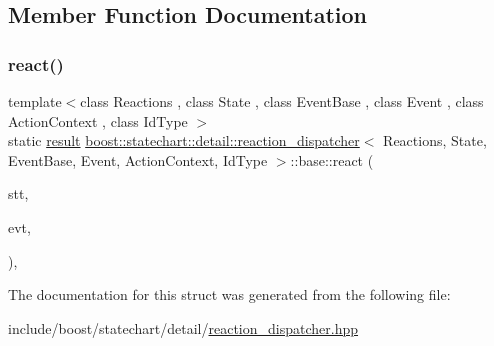\subsection{Member Function Documentation}
\mbox{\label{structboost_1_1statechart_1_1detail_1_1reaction__dispatcher_1_1base_acc2a12ce404e84665adf2b53ad6be6c0}} 
\subsubsection{\texorpdfstring{react()}{react()}}
{\footnotesize\ttfamily template$<$class Reactions , class State , class Event\+Base , class Event , class Action\+Context , class Id\+Type $>$ \\
static \mbox{\hyperlink{namespaceboost_1_1statechart_abe807f6598b614d6d87bb951ecd92331}{result}} \mbox{\hyperlink{classboost_1_1statechart_1_1detail_1_1reaction__dispatcher}{boost\+::statechart\+::detail\+::reaction\+\_\+dispatcher}}$<$ Reactions, State, Event\+Base, Event, Action\+Context, Id\+Type $>$\+::base\+::react (\begin{DoxyParamCaption}\item[{State \&}]{stt,  }\item[{const Event\+Base \&}]{evt,  }\item[{const Id\+Type \&}]{ }\end{DoxyParamCaption})\hspace{0.3cm}{\ttfamily [inline]}, {\ttfamily [static]}}



The documentation for this struct was generated from the following file\+:\begin{DoxyCompactItemize}
\item 
include/boost/statechart/detail/\mbox{\hyperlink{reaction__dispatcher_8hpp}{reaction\+\_\+dispatcher.\+hpp}}\end{DoxyCompactItemize}
